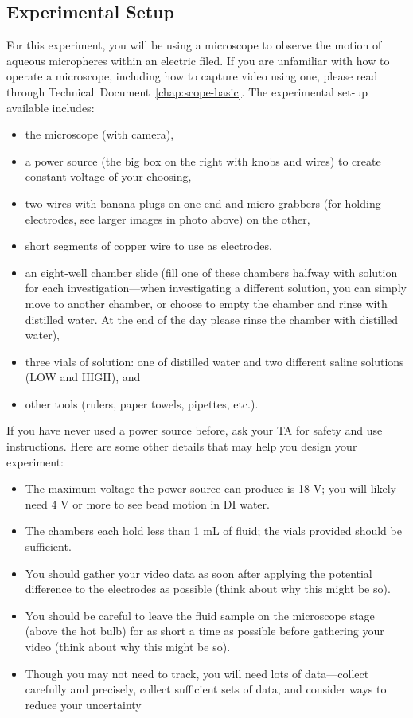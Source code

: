 \subsection*{Experimental Setup}
For this experiment, you will be using a microscope to observe the motion of aqueous micropheres within an electric filed. If you are unfamiliar with how to operate a microscope, including how to capture video using one, please read through Technical~Document~\ref{chap:scope-basic}. The experimental set-up available includes:
\begin{itemize}
\itemsep-0.5em
\item the microscope (with camera),
\item a power source (the big box on the right with knobs and wires) to create constant voltage of your choosing,
\item two wires with banana plugs on one end and micro-grabbers (for holding electrodes, see larger images in photo above) on the other,
\item short segments of copper wire to use as electrodes,
\item an eight-well chamber slide (fill one of these chambers halfway with solution for each investigation—when investigating a different solution, you can simply move to another chamber, or choose to empty the chamber and rinse with distilled water. At the end of the day please rinse the chamber with distilled water),
\item three vials of solution: one of distilled water and two different saline solutions (LOW and HIGH), and
\item other tools (rulers, paper towels, pipettes, etc.).
\end{itemize}
If you have never used a power source before, ask your TA for safety and use instructions. Here are some other details that may help you design your experiment:
\begin{itemize}
\itemsep-0.5em
\item The maximum voltage the power source can produce is 18 V; you will likely need 4 V or more to see bead motion in DI water.
\item The chambers each hold less than 1 mL of fluid; the vials provided should be sufficient.
\item You should gather your video data as soon after applying the potential difference to the
electrodes as possible (think about why this might be so).
\item You should be careful to leave the fluid sample on the microscope stage (above the hot
bulb) for as short a time as possible before gathering your video (think about why this might
be so).
\item Though you may not need to track, you will need lots of data—collect carefully and
precisely, collect sufficient sets of data, and consider ways to reduce your uncertainty
\end{itemize}


